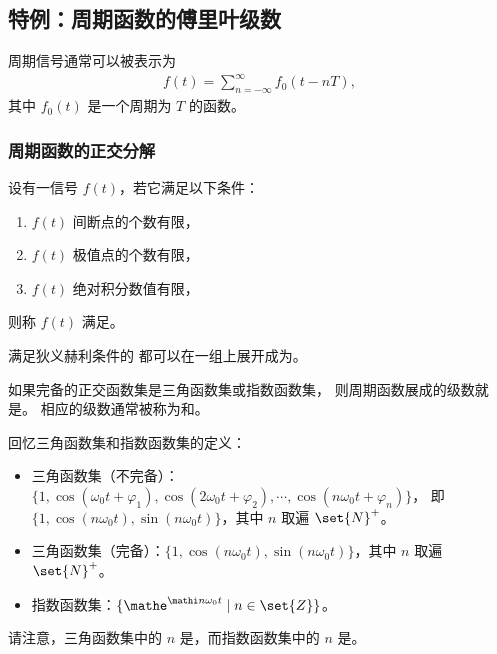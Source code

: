 \subsection{特例：周期函数的傅里叶级数}

\begin{remark}
    周期信号通常可以被表示为
    \begin{align*}
        f(t) = \sum_{n = -\infty}^{\infty} f_0(t - nT),
    \end{align*}
    其中 $f_0(t)$ 是一个周期为 $T$ 的函数。
\end{remark}

\subsubsection{周期函数的正交分解}

\begin{definition}[狄义赫利条件]
    设有一信号 $f(t)$，若它满足以下条件：
    \begin{enumerate}[label=(\arabic*)]
        \item $f(t)$ 间断点的个数有限，
        \item $f(t)$ 极值点的个数有限，
        \item $f(t)$ 绝对积分数值有限，
    \end{enumerate}
    则称 $f(t)$ 满足。
\end{definition}

\begin{theorem}
    满足狄义赫利条件的
    都可以在一组上展开成为。
\end{theorem}

\begin{definition}[傅里叶级数展开]
    如果完备的正交函数集是三角函数集或指数函数集，
    则周期函数展成的级数就是。
    相应的级数通常被称为和。
\end{definition}

\begin{note}
    回忆三角函数集和指数函数集的定义：
    \begin{itemize}
        \item 三角函数集（不完备）：$\{1, \cos(\omega_0t + \varphi_1), \cos(2\omega_0t + \varphi_2), \cdots, \cos(n\omega_0 t + \varphi_n)\}$，
            即 $\{1, \cos(n\omega_0t), \sin(n\omega_0t)\}$，其中 $n$ 取遍 $\set{N}^{+}$。
        \item 三角函数集（完备）：$\{1, \cos(n\omega_0 t), \sin(n\omega_0 t)\}$，其中 $n$ 取遍 $\set{N}^{+}$。
        \item 指数函数集：$\{\mathe^{\mathi n\omega_0t} \mid n \in \set{Z}\}$。
    \end{itemize}
    请注意，三角函数集中的 $n$ 是，而指数函数集中的 $n$ 是。
\end{note}

